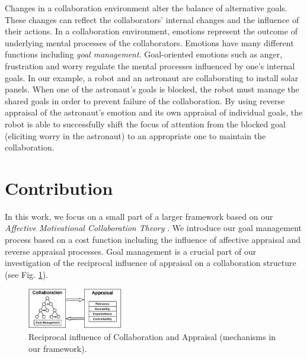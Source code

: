 \documentclass[conference]{IEEEtran}
\begin{document}
Changes in a collaboration environment alter the balance of alternative goals.
These changes can reflect the collaborators' internal changes and the influence
of their actions. In a collaboration environment, emotions represent the outcome
of underlying mental processes of the collaborators. Emotions have many
different functions \cite{scheutz:architectural-action-selection} including
\textit{goal management}. Goal-oriented emotions such as anger, frustration and
worry regulate the mental processes influenced by one's internal goals. In our
example, a robot and an astronaut are collaborating to install solar panels.
When one of the astronaut's goals is blocked, the robot must manage the shared
goals in order to prevent failure of the collaboration. By using reverse
appraisal \cite{gratch:reverse-appraisal} of the astronaut's emotion and its
own appraisal of individual goals, the robot is able to successfully shift the
focus of attention from the blocked goal (eliciting worry in the astronaut) to
an appropriate one to maintain the collaboration.

\vspace*{-2mm}
\section{Contribution}
\vspace*{-1mm}
In this work, we focus on a small part of a larger framework based on our
\textit{Affective Motivational Collaboration Theory}
\cite{shayganfar:amct-symbiotic}. We introduce our goal management process based
on a cost function including the influence of affective appraisal and reverse
appraisal processes. Goal management is a crucial part of our investigation of
the reciprocal influence of appraisal on a collaboration structure (see Fig.
\ref{fig:actionSelection}).

\begin{figure}[tbh]
  \centering
  \includegraphics[width=0.37\textwidth]{figure/ActionSelection-croped.pdf}
  \vspace*{-2mm}
  \caption{{\fontsize{9}{9}\selectfont Reciprocal influence of Collaboration
  and Appraisal (mechanisms in our framework).}}
  \label{fig:actionSelection}
  \vspace*{-7mm}
\end{figure}
\end{document}
